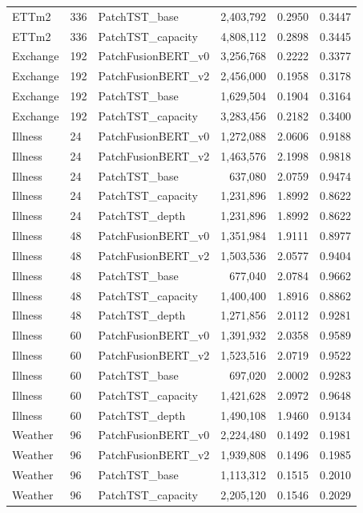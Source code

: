 \begin{tabular}{lllrcc}
ETTm2 & 336 & PatchTST_base & 2,403,792 & 0.2950 & 0.3447 \\
ETTm2 & 336 & PatchTST_capacity & 4,808,112 & 0.2898 & 0.3445 \\
Exchange & 192 & PatchFusionBERT_v0 & 3,256,768 & 0.2222 & 0.3377 \\
Exchange & 192 & PatchFusionBERT_v2 & 2,456,000 & 0.1958 & 0.3178 \\
Exchange & 192 & PatchTST_base & 1,629,504 & 0.1904 & 0.3164 \\
Exchange & 192 & PatchTST_capacity & 3,283,456 & 0.2182 & 0.3400 \\
Illness & 24 & PatchFusionBERT_v0 & 1,272,088 & 2.0606 & 0.9188 \\
Illness & 24 & PatchFusionBERT_v2 & 1,463,576 & 2.1998 & 0.9818 \\
Illness & 24 & PatchTST_base & 637,080 & 2.0759 & 0.9474 \\
Illness & 24 & PatchTST_capacity & 1,231,896 & 1.8992 & 0.8622 \\
Illness & 24 & PatchTST_depth & 1,231,896 & 1.8992 & 0.8622 \\
Illness & 48 & PatchFusionBERT_v0 & 1,351,984 & 1.9111 & 0.8977 \\
Illness & 48 & PatchFusionBERT_v2 & 1,503,536 & 2.0577 & 0.9404 \\
Illness & 48 & PatchTST_base & 677,040 & 2.0784 & 0.9662 \\
Illness & 48 & PatchTST_capacity & 1,400,400 & 1.8916 & 0.8862 \\
Illness & 48 & PatchTST_depth & 1,271,856 & 2.0112 & 0.9281 \\
Illness & 60 & PatchFusionBERT_v0 & 1,391,932 & 2.0358 & 0.9589 \\
Illness & 60 & PatchFusionBERT_v2 & 1,523,516 & 2.0719 & 0.9522 \\
Illness & 60 & PatchTST_base & 697,020 & 2.0002 & 0.9283 \\
Illness & 60 & PatchTST_capacity & 1,421,628 & 2.0972 & 0.9648 \\
Illness & 60 & PatchTST_depth & 1,490,108 & 1.9460 & 0.9134 \\
Weather & 96 & PatchFusionBERT_v0 & 2,224,480 & 0.1492 & 0.1981 \\
Weather & 96 & PatchFusionBERT_v2 & 1,939,808 & 0.1496 & 0.1985 \\
Weather & 96 & PatchTST_base & 1,113,312 & 0.1515 & 0.2010 \\
Weather & 96 & PatchTST_capacity & 2,205,120 & 0.1546 & 0.2029 \\

\end{tabular}
